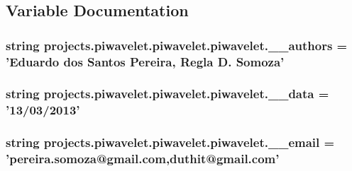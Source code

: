 \subsection{Variable Documentation}
\hypertarget{namespaceprojects_1_1piwavelet_1_1piwavelet_1_1piwavelet_a2ace4a8ef59b44e5b6534a1052f28dca}{
\subsubsection[{\-\_\-\-\_\-authors}]{\setlength{\rightskip}{0pt plus 5cm}string projects.\-piwavelet.\-piwavelet.\-piwavelet.\-\_\-\-\_\-authors = 'Eduardo dos Santos Pereira, Regla D. Somoza'}}\label{namespaceprojects_1_1piwavelet_1_1piwavelet_1_1piwavelet_a2ace4a8ef59b44e5b6534a1052f28dca}
\hypertarget{namespaceprojects_1_1piwavelet_1_1piwavelet_1_1piwavelet_a881c963906cb656a47bbddc1e420a69e}{
\subsubsection[{\-\_\-\-\_\-data}]{\setlength{\rightskip}{0pt plus 5cm}string projects.\-piwavelet.\-piwavelet.\-piwavelet.\-\_\-\-\_\-data = '13/03/2013'}}\label{namespaceprojects_1_1piwavelet_1_1piwavelet_1_1piwavelet_a881c963906cb656a47bbddc1e420a69e}
\hypertarget{namespaceprojects_1_1piwavelet_1_1piwavelet_1_1piwavelet_a5b8a45d724de88e32186db27be99817e}{
\subsubsection[{\-\_\-\-\_\-email}]{\setlength{\rightskip}{0pt plus 5cm}string projects.\-piwavelet.\-piwavelet.\-piwavelet.\-\_\-\-\_\-email = 'pereira.\-somoza@gmail.\-com,duthit@gmail.\-com'}}\label{namespaceprojects_1_1piwavelet_1_1piwavelet_1_1piwavelet_a5b8a45d724de88e32186db27be99817e}
